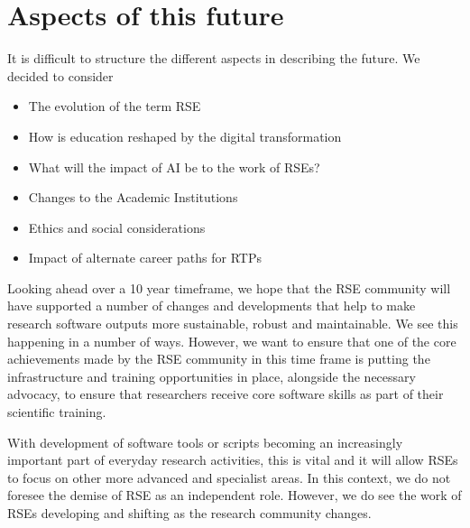 \documentclass{eceasst}
\begin{document}
\section{Aspects of this future}
It is difficult to structure the different aspects in describing the future. We decided to consider
\begin{itemize}
\item The evolution of the term RSE
\item How is education reshaped by the digital transformation
\item What will the impact of AI be to the work of RSEs?
\item Changes to the Academic Institutions
\item Ethics and social considerations
\item Impact of alternate career paths for RTPs
\end{itemize}


Looking ahead over a 10 year timeframe, we hope that the RSE community will have
supported a number of changes and developments that help to make research software outputs
more sustainable, robust and maintainable. We see this happening in a number of ways. However,
we want to ensure that one of the core achievements made by the RSE community in this time
frame is putting the infrastructure and training opportunities in place, alongside the necessary
advocacy, to ensure that researchers receive core software skills as part of their scientific training.

With development of software tools or scripts becoming an increasingly important part of everyday
research activities, this is vital and it will allow RSEs to focus on other more advanced and specialist
areas. In this context, we do not foresee the demise of RSE as an independent role. However, we
do see the work of RSEs developing and shifting as the research community changes.
\end{document}
